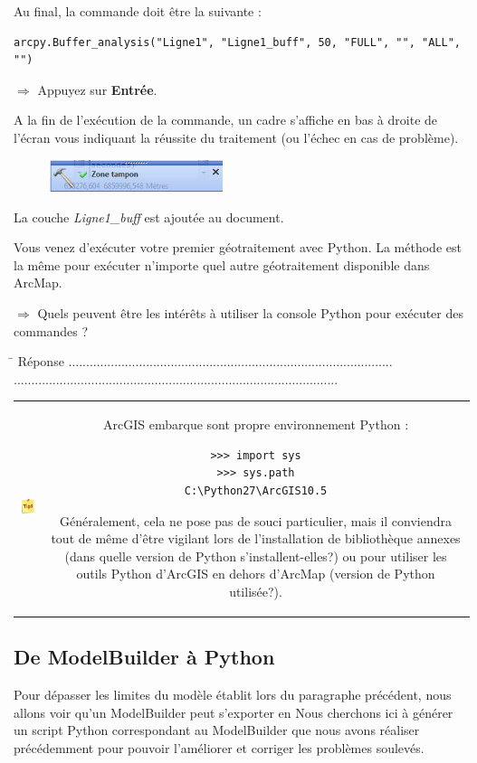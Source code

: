\documentclass[11pt]{article}
\newcommand{\action}{$\Rightarrow$ }
\newcommand{\reponse}{
	\begin{tabbing}
	\hspace{2cm}\=\kill
	Réponse \> ............................................................................................ \\ 
 	\> ............................................................................................
	\end{tabbing}
}
\newenvironment{note}{%
	\begin{tabular}[t t]{c c}
		\includegraphics{img/tips.png}
		 &
		\begin{minipage}[c]{0.9\linewidth}
			\begin{sffamily}
}{%
			\end{sffamily}
		\end{minipage}
	\end{tabular}	
}
\begin{document}
Au final, la commande doit être la suivante :
\begin{lstlisting}
arcpy.Buffer_analysis("Ligne1", "Ligne1_buff", 50, "FULL", "", "ALL", "")
\end{lstlisting}
	
\action Appuyez sur \textbf{Entrée}.

A la fin de l'exécution de la commande, un cadre s'affiche en bas à droite de l'écran vous indiquant la réussite du traitement (ou l'échec en cas de problème).
\begin{figure}[H]
	\center \includegraphics[width=0.45\textwidth]{img/td3/python_resultat_geotraitement.png}\\
\end{figure}

La couche \textit{Ligne1\_buff} est ajoutée au document. 

Vous venez d'exécuter votre premier géotraitement avec Python. La méthode est la même pour exécuter n'importe quel autre géotraitement disponible dans ArcMap.

\action Quels peuvent être les intérêts à utiliser la console Python pour exécuter des commandes ?

\reponse

\begin{note}
ArcGIS embarque sont propre environnement Python : 
\begin{lstlisting}
>>> import sys
>>> sys.path
C:\Python27\ArcGIS10.5
\end{lstlisting}
Généralement, cela ne pose pas de souci particulier, mais il conviendra tout de même d'être vigilant lors de l'installation de bibliothèque annexes (dans quelle version de Python s'installent-elles?) ou pour utiliser les outils Python d'ArcGIS en dehors d'ArcMap (version de Python utilisée?). 
\end{note}





\subsection{De ModelBuilder à Python}
\label{scriptautonome}
Pour dépasser les limites du modèle établit lors du paragraphe précédent, nous allons voir qu'un ModelBuilder peut s'exporter en 
Nous cherchons ici à générer un script Python correspondant au ModelBuilder que nous avons réaliser précédemment pour pouvoir l'améliorer et corriger les problèmes soulevés.
\end{document}
